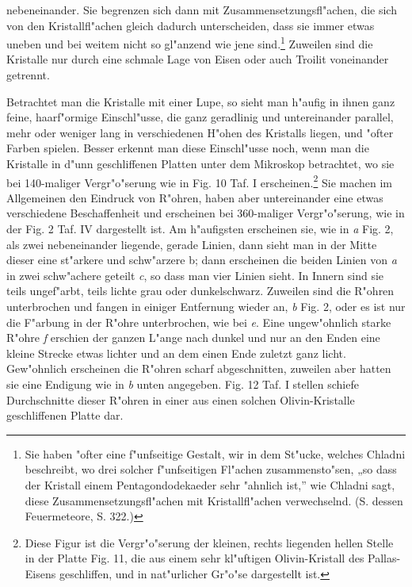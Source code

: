 \documentclass[a4paper, 11pt, oneside]{article}
\begin{document}
nebeneinander. Sie begrenzen sich dann mit Zusammensetzungsfl"achen, die sich von den Kristallfl"achen gleich dadurch unterscheiden, dass sie immer etwas uneben und bei weitem nicht so gl"anzend wie jene sind.\footnote{Sie haben "ofter eine f"unfseitige Gestalt, wir in dem St"ucke, welches Chladni beschreibt, wo drei solcher f"unfseitigen Fl"achen zusammensto"sen, „so dass der Kristall einem Pentagondodekaeder sehr "ahnlich ist,” wie Chladni sagt, diese Zusammensetzungsfl"achen mit Kristallfl"achen verwechselnd. (S. dessen Feuermeteore, S. 322.)} Zuweilen sind die Kristalle nur durch eine schmale Lage von Eisen oder auch Troilit voneinander getrennt.

Betrachtet man die Kristalle mit einer Lupe, so sieht man h"aufig in ihnen ganz feine, haarf"ormige Einschl"usse, die ganz geradlinig und untereinander parallel, mehr oder weniger lang in verschiedenen H"ohen des Kristalls liegen, und "ofter Farben spielen. Besser erkennt man diese Einschl"usse noch, wenn man die Kristalle in d"unn geschliffenen Platten unter dem Mikroskop betrachtet, wo sie bei 140-maliger Vergr"o"serung wie in Fig. 10 Taf. I erscheinen.\footnote{Diese Figur ist die Vergr"o"serung der kleinen, rechts liegenden hellen Stelle in der Platte Fig. 11, die aus einem sehr kl"uftigen Olivin-Kristall des Pallas-Eisens geschliffen, und in nat"urlicher Gr"o"se dargestellt ist.} Sie machen im Allgemeinen den Eindruck von R"ohren, haben aber untereinander eine etwas verschiedene Beschaffenheit und erscheinen bei 360-maliger Vergr"o"serung, wie in der Fig. 2 Taf. IV dargestellt ist. Am h"aufigsten erscheinen sie, wie in \emph{a} Fig. 2, als zwei nebeneinander liegende, gerade Linien, dann sieht man in der Mitte dieser eine st"arkere und schw"arzere b; dann erscheinen die beiden Linien von \emph{a} in zwei schw"achere geteilt \emph{c}, so dass man vier Linien sieht. In Innern sind sie teils ungef"arbt, teils lichte grau oder dunkelschwarz. Zuweilen sind die R"ohren unterbrochen und fangen in einiger Entfernung wieder an, \emph{b} Fig. 2, oder es ist nur die F"arbung in der R"ohre unterbrochen, wie bei \emph{e}. Eine ungew"ohnlich starke R"ohre \emph{f} erschien der ganzen L"ange nach dunkel und nur an den Enden eine kleine Strecke etwas lichter und an dem einen Ende zuletzt ganz licht. Gew"ohnlich erscheinen die R"ohren scharf abgeschnitten, zuweilen aber hatten sie eine Endigung wie in \emph{b} unten angegeben. Fig. 12 Taf. I stellen schiefe Durchschnitte dieser R"ohren in einer aus einen solchen Olivin-Kristalle geschliffenen Platte dar.
\end{document}
